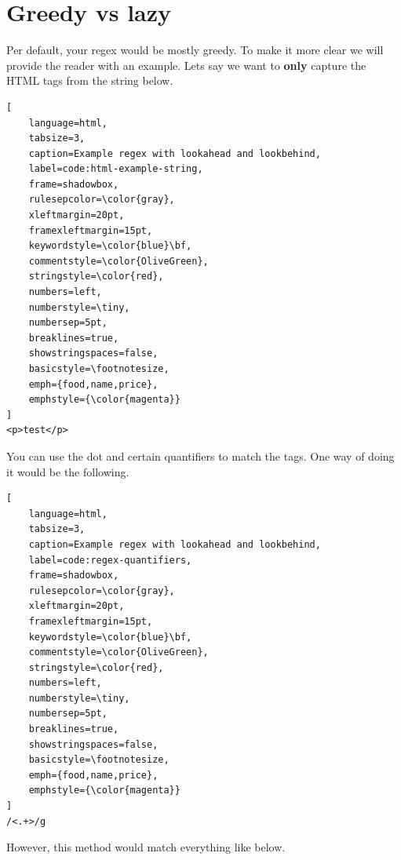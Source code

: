 \section{Greedy vs lazy}
\label{sec:greedy-vs-lazy}
Per default, your regex would be mostly greedy. To make it more clear we will provide the reader with an example. Lets say we want to \textbf{only} capture the HTML tags from the string below.

\begin{lstlisting}[
	language=html,
	tabsize=3,
	caption=Example regex with lookahead and lookbehind,
	label=code:html-example-string,
	frame=shadowbox,
	rulesepcolor=\color{gray},
	xleftmargin=20pt,
	framexleftmargin=15pt,
	keywordstyle=\color{blue}\bf,
	commentstyle=\color{OliveGreen},
	stringstyle=\color{red},
	numbers=left,
	numberstyle=\tiny,
	numbersep=5pt,
	breaklines=true,
	showstringspaces=false,
	basicstyle=\footnotesize,
	emph={food,name,price},
	emphstyle={\color{magenta}}
]
<p>test</p>
\end{lstlisting}
You can use the dot and certain quantifiers to match the tags. One way of doing it would be the following.
\begin{lstlisting}[
	language=html,
	tabsize=3,
	caption=Example regex with lookahead and lookbehind,
	label=code:regex-quantifiers,
	frame=shadowbox,
	rulesepcolor=\color{gray},
	xleftmargin=20pt,
	framexleftmargin=15pt,
	keywordstyle=\color{blue}\bf,
	commentstyle=\color{OliveGreen},
	stringstyle=\color{red},
	numbers=left,
	numberstyle=\tiny,
	numbersep=5pt,
	breaklines=true,
	showstringspaces=false,
	basicstyle=\footnotesize,
	emph={food,name,price},
	emphstyle={\color{magenta}}
]
/<.+>/g
\end{lstlisting}
However, this method would match everything like below.

